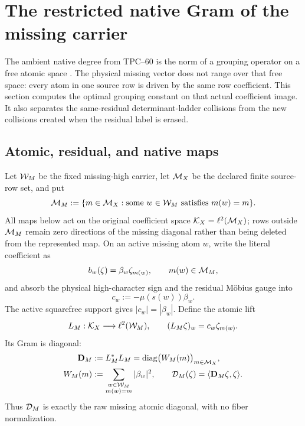 \section{The restricted native Gram of the missing carrier}
\label{sec:tpc61-restricted-gram}

The ambient native degree from TPC--60 is the norm of a grouping operator
on a free atomic space \citep{WangTPC60}.  The physical missing vector does
not range over that free space: every atom in one source row is driven by
the same row coefficient.  This section computes the optimal grouping
constant on that actual coefficient image.  It also separates the
same-residual determinant-ladder collisions from the new collisions created
when the residual label is erased.

\subsection{Atomic, residual, and native maps}

Let \(\mathcal W_M\) be the fixed missing-high carrier, let \(\mathcal M_X\) be the
declared finite source-row set, and put
\[
 \mathcal M_M:=\{m\in\mathcal M_X:
 \text{some }w\in\mathcal W_M\text{ satisfies }m(w)=m\}.
\]
All maps below act on the original coefficient space
\(\mathcal K_X=\ell^2(\mathcal M_X)\); rows outside \(\mathcal M_M\) remain zero directions of
the missing diagonal rather than being deleted from the represented map.
On an active missing atom
\(w\), write the literal coefficient as
\begin{equation}
 b_w(\zeta)=\beta_w\zeta_{m(w)},
 \qquad
 m(w)\in\mathcal M_M,
 \label{eq:tpc61-literal-missing-coefficient}
\end{equation}
and absorb the physical high-character sign and the residual M\"obius gauge
into
\begin{equation}
 c_w:=-\mu(s(w))\beta_w.
 \label{eq:tpc61-sign-compatible-atom}
\end{equation}
The active squarefree support gives
\(|c_w|=|\beta_w|\).  Define the atomic lift
\begin{equation}
 L_M:\mathcal K_X\longrightarrow\ell^2(\mathcal W_M),
 \qquad
 (L_M\zeta)_w=c_w\zeta_{m(w)}.
 \label{eq:tpc61-atomic-lift}
\end{equation}
Its Gram is diagonal:
\begin{align}
 \mathbf D_M
 &:=L_M^*L_M
   =\operatorname{diag}\bigl(W_M(m)\bigr)_{m\in\mathcal M_X},
 \label{eq:tpc61-missing-diagonal-matrix}\\
 W_M(m)
 &:=\sum_{\substack{w\in\mathcal W_M\\m(w)=m}}|\beta_w|^2,
 \qquad
 \mathcal D_M(\zeta)=\langle\mathbf D_M\zeta,\zeta\rangle.
 \label{eq:tpc61-row-missing-weight}
\end{align}
Thus \(\mathcal D_M\) is exactly the raw missing atomic diagonal, with no fiber
normalization.

